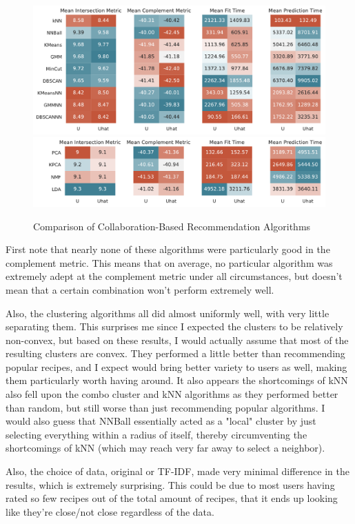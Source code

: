 \documentclass[11pt]{article}
\begin{document}
\begin{figure}[b!]
\centering
\includegraphics[width=1\textwidth]{figs/user_rdr.pdf}
\includegraphics[width=1\textwidth]{figs/user_dr.pdf}
\caption{Comparison of Collaboration-Based Recommendation Algorithms}
\label{fig:user_results}
\end{figure}

First note that nearly none of these algorithms were particularly good in the complement metric. This means that on average, no particular algorithm was extremely adept at the complement metric under all circumstances, but doesn't mean that a certain combination won't perform extremely well.

Also, the clustering algorithms all did almost uniformly well, with very little separating them. This surprises me since I expected the clusters to be relatively non-convex, but based on these results, I would actually assume that most of the resulting clusters are convex. They performed a little better than recommending popular recipes, and I expect would bring better variety to users as well, making them particularly worth having around. It also appears the shortcomings of kNN also fell upon the combo cluster and kNN algorithms as they performed better than random, but still worse than just recommending popular algorithms. I would also guess that NNBall essentially acted as a "local" cluster by just selecting everything within a radius of itself, thereby circumventing the shortcomings of kNN (which may reach very far away to select a neighbor).

Also, the choice of data, original or TF-IDF, made very minimal difference in the results, which is extremely surprising. This could be due to most users having rated so few recipes out of the total amount of recipes, that it ends up looking like they're close/not close regardless of the data. 
\end{document}
